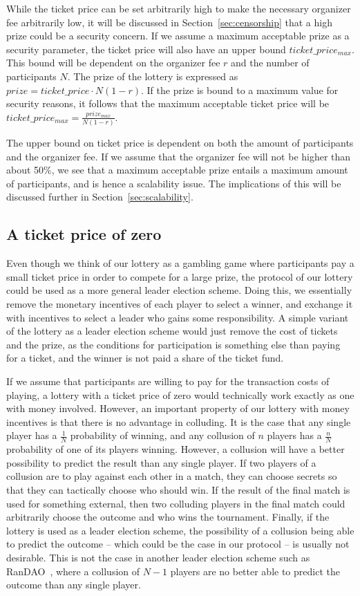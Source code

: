 While the ticket price can be set arbitrarily high to make the necessary organizer fee arbitrarily low, it will be discussed in Section~\ref{sec:censorship} that a high prize could be a security concern. If we assume a maximum acceptable prize as a security parameter, the ticket price will also have an upper bound $ticket\_price_{max}$. This bound will be dependent on the organizer fee $r$ and the number of participants $N$. The prize of the lottery is expressed as $prize=ticket\_price \cdot N(1-r)$. If the prize is bound to a maximum value for security reasons, it follows that the maximum acceptable ticket price will be $ticket\_price_{max}=\frac{prize_{max}}{N(1-r)}$. 

The upper bound on ticket price is dependent on both the amount of participants and the organizer fee. If we assume that the organizer fee will not be higher than about 50\%, we see that a maximum acceptable prize entails a maximum amount of participants, and is hence a scalability issue. The implications of this will be discussed further in Section~\ref{sec:scalability}.

\subsection{A ticket price of zero}
Even though we think of our lottery as a gambling game where participants pay a small ticket price in order to compete for a large prize, the protocol of our lottery could be used as a more general leader election scheme. Doing this, we essentially remove the monetary incentives of each player to select a winner, and exchange it with incentives to select a leader who gains some responsibility. A simple variant of the lottery as a leader election scheme would just remove the cost of tickets and the prize, as the conditions for participation is something else than paying for a ticket, and the winner is not paid a share of the ticket fund.

If we assume that participants are willing to pay for the transaction costs of playing, a lottery with a ticket price of zero would technically work exactly as one with money involved. However, an important property of our lottery with money incentives is that there is no advantage in colluding. It is the case that any single player has a $\frac{1}{N}$ probability of winning, and any collusion of $n$ players has a $\frac{n}{N}$ probability of one of its players winning. However, a collusion will have a better possibility to predict the result than any single player. If two players of a collusion are to play against each other in a match, they can choose secrets so that they can tactically choose who should win. If the result of the final match is used for something external, then two colluding players in the final match could arbitrarily choose the outcome and who wins the tournament. Finally, if the lottery is used as a leader election scheme, the possibility of a collusion being able to predict the outcome – which could be the case in our protocol – is usually not desirable. This is not the case in another leader election scheme such as RanDAO~\cite{randao2015randao}, where a collusion of $N-1$ players are no better able to predict the outcome than any single player.

